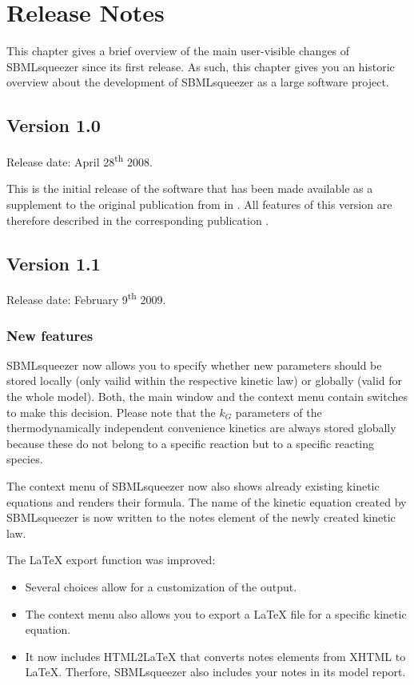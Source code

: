 \chapter{Release Notes}

This chapter gives a brief overview of the main user-visible changes of
SBMLsqueezer since its first release. As such, this chapter gives you an
historic overview about the development of SBMLsqueezer as a large software
project.  

\section{Version 1.0}

Release date: April 28\textsuperscript{th} 2008.

This is the initial release of the software that has been made available as
a supplement to the original publication from in \citeyear{Draeger2008}. All
features of this version are therefore described in the corresponding
publication \cite{Draeger2008}.

\section{Version 1.1}

Release date: February 9\textsuperscript{th} 2009.

\subsection{New features}

SBMLsqueezer now allows you to specify whether new parameters should be stored
locally (only vailid within the respective kinetic law) or globally (valid for
the whole model). Both, the main window and the context menu contain switches to
make this decision. Please note that the $k_G$ parameters of the
thermodynamically independent convenience kinetics are always stored globally
because these do not belong to a specific reaction but to a specific reacting
species.

The context menu of SBMLsqueezer now also shows already existing kinetic
equations and renders their formula. The name of the kinetic equation created by
SBMLsqueezer is now written to the notes element of the newly created kinetic
law.

The \LaTeX{} export function was improved:
\begin{itemize}
  \item Several choices allow for a customization of the output.
  \item The context menu also allows you to export a LaTeX file for a specific
        kinetic equation.
  \item It now includes HTML2\LaTeX{} that converts notes elements from XHTML to
        \LaTeX. Therfore, SBMLsqueezer also includes your notes in its model
        report.
\end{itemize}

